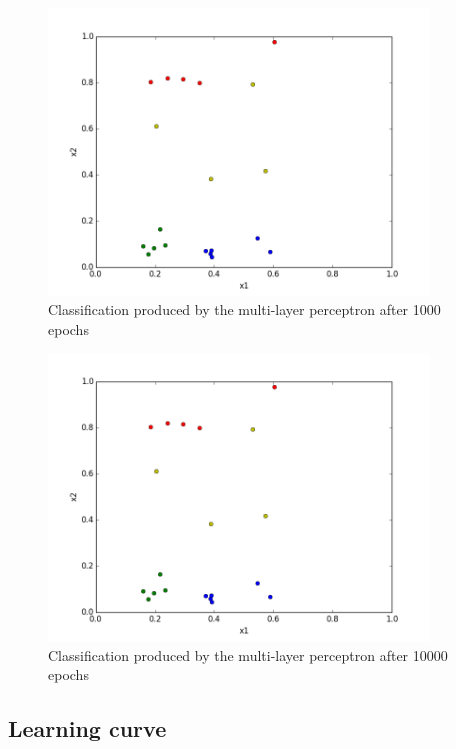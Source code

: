 \documentclass[]{article}
\begin{document}
\begin{figure}[h]
    \centering
    \includegraphics[width=0.9\textwidth]{figures/mlp_classification_1000.png}
    \caption{Classification produced by the multi-layer perceptron after 1000 epochs}
    \label{fig:mlp_classification_1000}
\end{figure}

\begin{figure}[h]
    \centering
    \includegraphics[width=0.9\textwidth]{figures/mlp_classification_10000.png}
    \caption{Classification produced by the multi-layer perceptron after 10000 epochs}
    \label{fig:mlp_classification_10000}
\end{figure}


\subsection{Learning curve}
\end{document}

